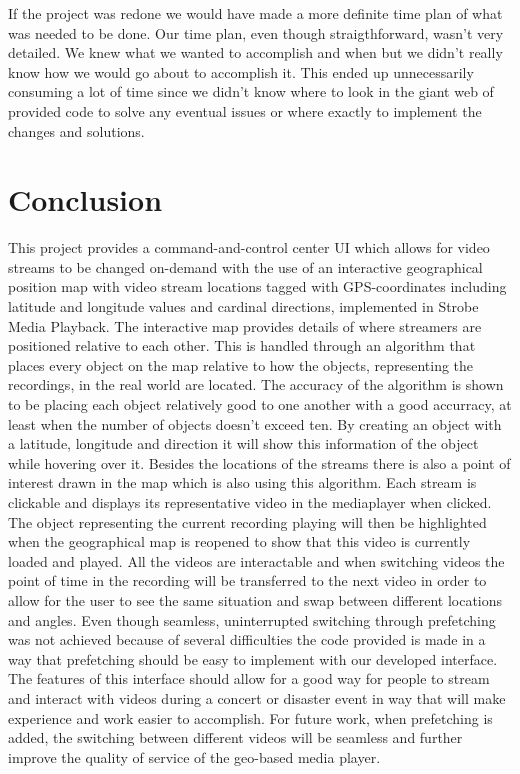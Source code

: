 \documentclass[9pt,a4paper]{acmproc}
\begin{document}
If the project was redone we would have made a more definite time plan of what was needed to be done. Our time plan, even though straigthforward, wasn’t very detailed. We knew what we wanted to accomplish and when but we didn’t really know how we would go about to accomplish it. This ended up unnecessarily consuming a lot of time since we didn’t know where to look in the giant web of provided code to solve any eventual issues or where exactly to implement the changes and solutions.

\section{Conclusion}

This project provides a command-and-control center UI which allows for video streams to be changed on-demand with the use of an interactive geographical position map with video stream locations tagged with GPS-coordinates including latitude and longitude values and cardinal directions, implemented in Strobe Media Playback. The interactive map provides details of where streamers are positioned relative to each other. This is handled through an algorithm that places every object on the map relative to how the objects, representing the recordings, in the real world are located. The accuracy of the algorithm is shown to be placing each object relatively good to one another with a good accurracy, at least when the number of objects doesn’t exceed ten. By creating an object with a latitude, longitude and direction it will show this information of the object while hovering over it. Besides the locations of the streams there is also a point of interest drawn in the map which is also using this algorithm. Each stream is clickable and displays its representative video in the mediaplayer when clicked. The object representing the current recording playing will then be highlighted when the geographical map is reopened to show that this video is currently loaded and played. All the videos are interactable and when switching videos the point of time in the recording will be transferred to the next video in order to allow for the user to see the same situation and swap between different locations and angles. Even though seamless, uninterrupted switching through prefetching was not achieved because of several difficulties the code provided is made in a way that prefetching should be easy to implement with our developed interface. The features of this interface should allow for a good way for people to stream and interact with videos during a concert or disaster event in way that will make experience and work easier to accomplish. For future work, when prefetching is added, the switching between different videos will be seamless and further improve the quality of service of the geo-based media player.
\end{document}
